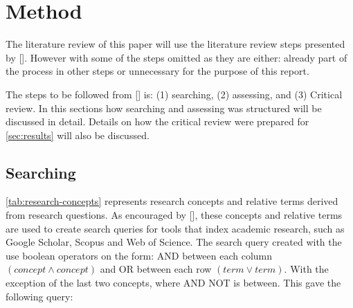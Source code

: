 \section{Method}
The literature review of this paper will use the literature review steps presented by [\cite{bjo_2012}]. However with some of the steps omitted as they are either: already part of the process in other steps or unnecessary for the purpose of this report.

The steps to be followed from [\cite{bjo_2012}] is: (1) searching, (2) assessing, and (3) Critical review. In this sections how searching and assessing was structured will be discussed in detail. Details on how the critical review were prepared for \autoref{sec:results} will also be discussed.





\subsection{Searching}
\autoref{tab:research-concepts} represents research concepts and relative terms derived from research questions. As encouraged by [\cite{bjo_2012}], these concepts and relative terms are used to create search queries for tools that index academic research, such as Google Scholar, Scopus and Web of Science. The search query created with the use boolean operators on the form: AND between each column $(concept \land concept)$ and OR between each row $(term \lor term)$. With the exception of the last two concepts, where AND NOT is between. This gave the following query:

